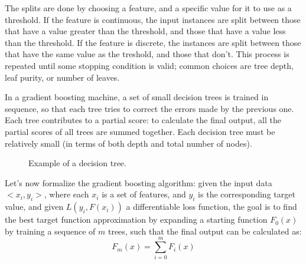 The splits are done by choosing a feature, and a specific value for it to use as a threshold. If the feature is continuous, the input instances are split between those that have a value greater than the threshold, and those that have a value less than the threshold. If the feature is discrete, the instances are split between those that have the same value as the treshold, and those that don't. This process is repeated until some stopping condition is valid; common choices are tree depth, leaf purity, or number of leaves.

In a gradient boosting machine, a set of small decision trees is trained in sequence, so that each tree tries to correct the errors made by the previous one. Each tree contributes to a partial score: to calculate the final output, all the partial scores of all trees are summed together. Each decision tree must be relatively small (in terms of both depth and total number of nodes).

\begin{figure}[H]
    \centering
    
    \caption{Example of a decision tree.}
\end{figure} 

Let's now formalize the gradient boosting algorithm: given the input data $<x_i,y_i>$, where each $x_i$ is a set of features, and $y_i$ is the corresponding target value, and given $L(y_i, F(x_i))$ a differentiable loss function, the goal is to find the best target function approximation by expanding a starting function $F_0(x)$ by training a sequence of $m$ trees, such that the final output can be calculated as:
\begin{equation*}
    F_m(x) = \sum_{i=0}^m F_i(x)
\end{equation*}

